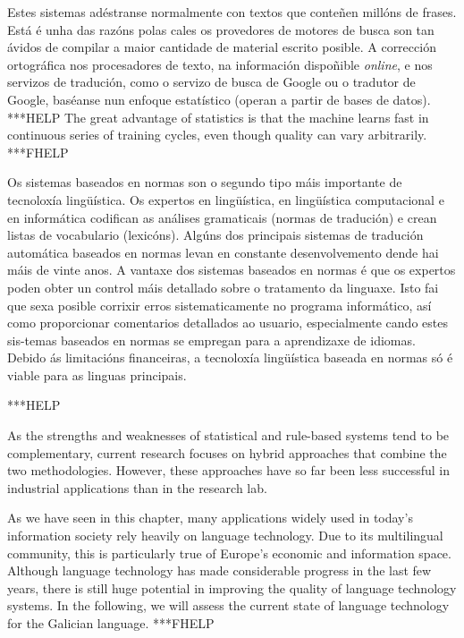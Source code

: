\begin{multicols}{2}
Estes sistemas adéstranse normalmente con textos que conteñen millóns de frases. Está é unha das razóns polas cales os provedores de motores de busca son tan ávidos de compilar a maior cantidade de material escrito posible. A corrección ortográfica nos procesadores de texto, na información dispoñible \textit{online}, e nos servizos de tradución, como o servizo de busca de Google ou o tradutor de Google, baséanse nun enfoque estatístico (operan a partir de bases de datos).   ***HELP The great advantage of statistics is that the machine learns fast in continuous series of training cycles, even though quality can vary arbitrarily. ***FHELP

Os sistemas baseados en normas son o segundo tipo máis importante de tecnoloxía lingüística. Os expertos en lingüística, en lingüística computacional e en informática codifican as análises gramaticais (normas de tradución) e crean listas de vocabulario (lexicóns).   Algúns dos principais sistemas de tradución automática baseados en normas levan en constante desenvolvemento dende hai máis de vinte anos. A vantaxe dos sistemas baseados en normas é que os expertos poden obter un control máis detallado sobre o tratamento da linguaxe. Isto fai que sexa posible corrixir erros sistematicamente no programa informático, así como proporcionar comentarios detallados ao usuario, especialmente cando estes sis-temas baseados en normas se empregan para a aprendizaxe de idiomas. Debido ás limitacións financeiras, a tecnoloxía lingüística baseada en normas só é viable para as linguas principais. 

***HELP

    As the strengths and weaknesses of statistical and rule-based systems tend to be complementary, current research focuses on hybrid approaches that combine the two methodologies. However, these approaches have so far been less successful in industrial applications than in the research lab. 

    As we have seen in this chapter, many applications widely used in today’s information society rely heavily on language technology. Due to its multilingual community, this is particularly true of Europe’s economic and information space. Although language technology has made considerable progress in the last few years, there is still huge potential in improving the quality of language technology systems. In the following, we will assess the current state of language technology for the Galician language.
***FHELP
\end{multicols}



